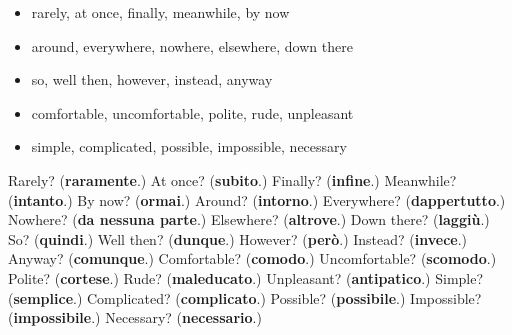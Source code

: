 \begin{itemize}
\raggedright
  \item rarely, at once, finally, meanwhile, by now
  \item around, everywhere, nowhere, elsewhere, down there
  \item so, well then, however, instead, anyway
  \item comfortable, uncomfortable, polite, rude, unpleasant
  \item simple, complicated, possible, impossible, necessary
\end{itemize}

\begin{tcolorbox}[breakable,colback=teal!4,colframe=teal!35!black,title={Before you move on}]
Rarely? (\textbf{raramente}.) At once? (\textbf{subito}.) Finally? (\textbf{infine}.) Meanwhile? (\textbf{intanto}.) By now? (\textbf{ormai}.) Around? (\textbf{intorno}.) Everywhere? (\textbf{dappertutto}.) Nowhere? (\textbf{da nessuna parte}.) Elsewhere? (\textbf{altrove}.) Down there? (\textbf{laggiù}.) So? (\textbf{quindi}.) Well then? (\textbf{dunque}.) However? (\textbf{però}.) Instead? (\textbf{invece}.) Anyway? (\textbf{comunque}.) Comfortable? (\textbf{comodo}.) Uncomfortable? (\textbf{scomodo}.) Polite? (\textbf{cortese}.) Rude? (\textbf{maleducato}.) Unpleasant? (\textbf{antipatico}.) Simple? (\textbf{semplice}.) Complicated? (\textbf{complicato}.) Possible? (\textbf{possibile}.) Impossible? (\textbf{impossibile}.) Necessary? (\textbf{necessario}.)
\end{tcolorbox}
